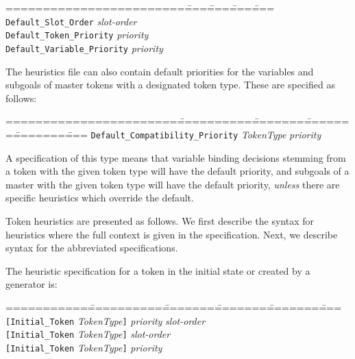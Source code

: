 \begin{tabbing}
========================\====\====\====\====\kill
{\tt Default\_Slot\_Order}        \>      {\em slot-order} \\
{\tt Default\_Token\_Priority}    \>      {\em priority}\\
{\tt Default\_Variable\_Priority} \>      {\em priority}
\end{tabbing}

The heuristics file can also contain default priorities for 
the variables and subgoals of master tokens with a designated
token type. These are specified as follows:
 
\begin{tabbing}
=======================\===========\========\========\========\====\kill
{\tt Default\_Compatibility\_Priority}\>    {\em TokenType} \> {\em priority}
\end{tabbing}

A specification of this type means that variable binding decisions
stemming from a token with the given token type will have the default
priority, and subgoals of a master with the given token type will 
have the default priority, {\em unless} there are specific heuristics
which override the default.  

Token heuristics are presented as follows.  We first describe the syntax
for heuristics where the full context is given in the specification.
Next, we describe syntax for the abbreviated specifications.

The heuristic specification for a token in the initial state or created by a 
generator is: 

\begin{tabbing}
===========\===========\========\========\========\====\kill
{\tt [Initial\_Token} \>    {\em TokenType}{\tt]} \> {\em priority} \> {\em slot-order}\\
{\tt [Initial\_Token} \>    {\em TokenType}{\tt]} \> {\em slot-order}\\
{\tt [Initial\_Token} \>    {\em TokenType}{\tt]} \> {\em priority}\\
\end{tabbing}

